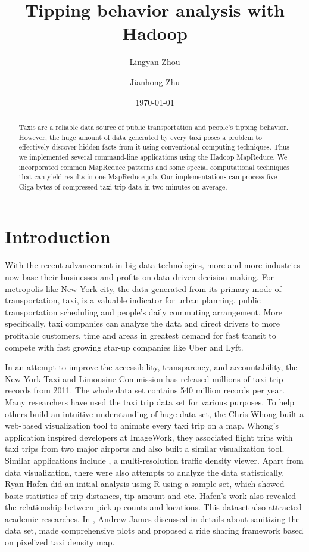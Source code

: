 \documentclass[12pt,a4paper]{article}
\author{Lingyan Zhou \and Jianhong Zhu}
\date{\today}
\title{Tipping behavior analysis with Hadoop}
\begin{document}
\maketitle

\begin{abstract}
  Taxis are a reliable data source of public transportation and people's tipping behavior. However, the huge amount of data generated by every taxi poses a problem to effectively discover hidden facts from it using conventional computing techniques. Thus we implemented several command-line applications using the Hadoop MapReduce. We incorporated common MapReduce patterns and some special computational techniques that can yield results in one MapReduce job. Our implementations can process five Giga-bytes of compressed taxi trip data in two minutes on average.
\end{abstract}

\newpage

\tableofcontents
\newpage

\section{Introduction}
With the recent advancement in big data technologies, more and more industries now base their businesses and profits on data-driven decision making. For metropolis like New York city, the data generated from its primary mode of transportation, taxi, is a valuable indicator for urban planning, public transportation scheduling and people's daily commuting arrangement. More specifically, taxi companies can analyze the data and direct drivers to more profitable customers, time and areas in greatest demand for fast transit to compete with fast growing star-up companies like Uber and Lyft.

In an attempt to improve the accessibility, transparency, and accountability, the New York Taxi and Limousine Commission has released millions of taxi trip records from 2011\cite{nyctlcwebsite}. The whole data set contains 540 million records per year. Many researchers have used the taxi trip data set for various purposes. To help others build an intuitive understanding of huge data set, the Chris Whong built a web-based visualization tool to animate every taxi trip on a map\cite{nyctaxyvisualwebsite}. Whong's application inspired developers at ImageWork, they associated flight trips with taxi trips from two major airports and also built a similar visualization tool\cite{flighttaxiwebsite}. Similar applications include \cite{hubcabwebsite}, a multi-resolution traffic density viewer. Apart from data visualization, there were also attempts to analyze the data statistically. Ryan Hafen did an initial analysis using R using a sample set, which showed basic statistics of trip distances, tip amount and etc\cite{hafenwebsite}. Hafen's work also revealed the relationship between pickup counts and locations\cite{hafenwebsite}. This dataset also attracted academic researches. In \cite{andrewj}, Andrew James discussed in details about sanitizing the data set, made comprehensive plots and proposed a ride sharing framework based on pixelized taxi density map. 
\end{document}
